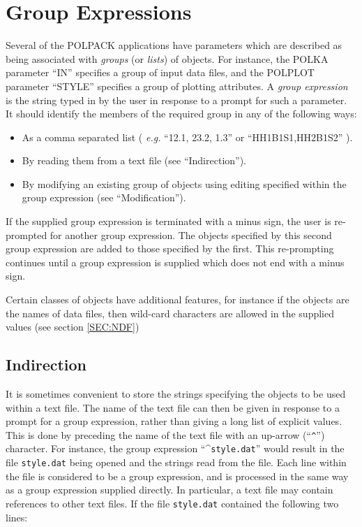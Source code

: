 \documentclass[twoside,11pt]{article}
\newcommand{\hyperref}[4]{#2\ref{#4}#3}
\newcommand{\htmlref}[2]{#1}
\newcommand{\xlabel}[1]{}
\renewcommand{\_}{\texttt{\symbol{95}}}
\begin{document}
\section{\label{SEC:GRPEXP}\xlabel{groupexpressions}Group Expressions}
Several of the POLPACK applications have parameters which are described
 as being associated with
\emph{groups} (or \emph{lists}) of objects. For instance, the 
\htmlref{POLKA}{POLKA} parameter ``IN'' specifies a group of input data 
files, and the \htmlref{POLPLOT}{POLPLOT} parameter ``STYLE'' specifies a
group of plotting attributes. A \emph{group expression} is the string
typed in by the user in response to a prompt for such a parameter. It
should identify the members of the required group in any of the following
ways:

\begin{itemize}
\item As a comma separated list ( \emph{e.g.} ``12.1, 23.2, 1.3''
     or ``HH1\_B1S1,HH2\_B1S2'' ). 

\item By reading them from a text file (see
     ``\htmlref{Indirection}{SEC:IND}'').

\item By modifying an existing group of objects using editing 
     specified within the group expression (see
     ``\htmlref{Modification}{SEC:MOD}'').
\end{itemize}

If the supplied group expression is terminated with a minus
sign, the user is re-prompted for another group expression. The
objects specified by this second group expression are added to
those specified by the first. This re-prompting continues until
a group expression is supplied which does not end with a minus
sign. 

Certain classes of objects have additional features, for 
instance if the objects are the names of data files, then wild-card characters 
are allowed in the supplied values (see \hyperref{here}{section }{}{SEC:NDF}) 

\subsection{\label{SEC:IND}Indirection}
It is sometimes convenient to store the strings specifying the objects to
be used within a text file. The name of the text file can then be given
in response to a prompt for a group expression, rather than giving a long
list of explicit values. This is done by preceding the name of the text
file with an up-arrow (``\verb+^+'') character. For instance, the group
expression ``\^{}\verb+style.dat+'' would result in the file
\verb+style.dat+ being opened and the strings read from the file. Each
line within the file is considered to be a group expression, and is
processed in the same way as a group expression supplied directly. In
particular, a text file may contain references to other text files. If
the file
\verb+style.dat+ contained the following two lines:
\end{document}
